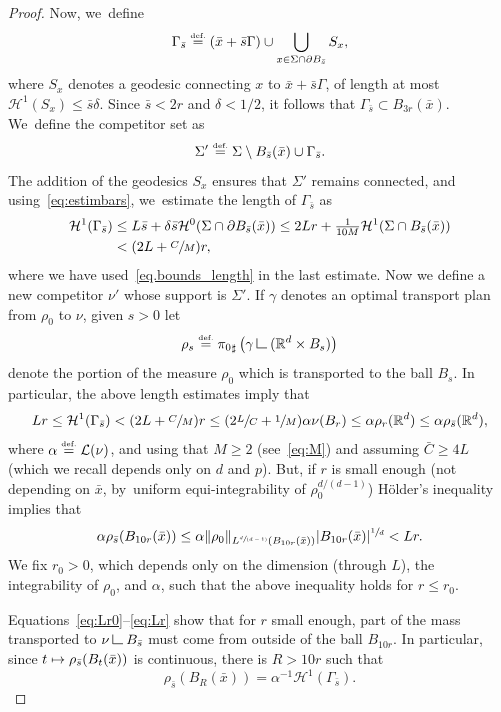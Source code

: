 \documentclass[JEP,XML,SOM,Unicode,NoFloatCountersInSection,published]{cedram}
\newcommand\mto{\mathchoice{\longmapsto}{\mapsto}{\mapsto}{\mapsto}}
\newcommand{\spfrac}[2]{\sfrac{#1}{(#2)}}
\theoremstyle{definition}
\newcommand{\eqdef}{\ensuremath{\stackrel{\mbox{\upshape\tiny def.}}{=}}}
\newcommand\LM[1]{\hbox{\vrule width.5pt \vbox to#1pt{\vfill \hrule width#1pt height.5pt}}}
\newcommand\LL{{\mathchoice {\>\LM7\>}{\>\LM7\>}{\,\LM5\,}{\,\LM{3.35}\,}}}
\newcommand{\mres}{\LL}
\newcommand\cH{\mathcal{H}}
\newcommand\cL{\mathcal{L}}
\newcommand{\RR}{\mathbb{R}}
\begin{document}
\begin{proof}
Now, we~define
\[
\Gamma_{\bar s} \eqdef (\bar x + \bar s \Gamma) \cup \bigcup_{x \in \Sigma \cap \partial B_{\bar s}} S_x,
\]
where $S_x$ denotes a geodesic connecting $x$ to $\bar x + \bar s \Gamma$, of
length at most $\cH^1(S_x)\le \bar s\delta$.
Since $\bar s<2r$ and $\delta<1/2$, it follows that $\Gamma_{\bar s} \subset B_{3r}(\bar x)$. We~define the competitor set as
\[
\Sigma' \eqdef \Sigma \setminus B_{\bar s}(\bar x) \cup \Gamma_{\bar s}.
\]
The addition of the geodesics $S_x$ ensures that $\Sigma'$ remains connected, and using~\eqref{eq:estimbars}, we~estimate the length of $\Gamma_{\bar s}$ as
\begin{equation}\label{eq:lengthGamma}
\begin{aligned}
\cH^1(\Gamma_{\bar s})
&\le L\bar s + \delta\bar s\cH^0(\Sigma\cap\partial B_{\bar s}(\bar x))
\le 2Lr + \tfrac{1}{10M}\cH^1(\Sigma\cap B_{\bar s}(\bar x))\\
&< (2L + \sfrac{C}{M})r,
\end{aligned}
\end{equation}
where we have used~\eqref{eq.bounds_length} in the last estimate.
Now we define a new competitor $\nu'$ whose support is $\Sigma'$. If $\gamma$ denotes an optimal transport plan from $\rho_0$ to $\nu$, given $s >0$ let
\[
\rho_{s} \eqdef {\pi_{0}}_\sharp\left(\gamma \mres(\RR^d\times B_{s})\right)
\]
denote the portion of the measure $\rho_0$ which is transported to the ball $B_{s}$. In particular, the above length estimates imply that
\begin{equation}\label{eq:Lr0}
Lr
\le
\cH^1(\Gamma_{\bar s})
<
(2L+\sfrac{C}{M})r
\le
(2\sfrac{L}{C}+\sfrac{1}{M})\alpha\nu(B_r)
\le
\alpha \rho_r(\RR^d)\leq \alpha \rho_{\bar s}(\RR^d),
\end{equation}
where $\alpha\eqdef\cL(\nu)$, and using that $M\ge 2$ (see~\eqref{eq:M}) and assuming $\bar C\ge 4L$ (which we recall depends
only on $d$ and $p$).
But, if $r$ is small enough (not depending on $\bar x$, by~uniform equi-integrability
of $\rho_0^{d/(d-1)}$) Hölder's inequality implies that
\begin{equation}\label{eq:Lr}
\alpha \rho_{\bar s}(B_{10r}(\bar x))
\le
\alpha\|\rho_0\|_{L^{\spfrac{d}{d-1}}(B_{10r}(\bar x))}
|B_{10r}(\bar x)|^{\sfrac{1}{d}} < Lr.
\end{equation}
We fix $r_0>0$, which depends only on the dimension (through $L$), the integrability of $\rho_0$, and $\alpha$, such that the above inequality holds for $r\le r_0$.

Equations~\eqref{eq:Lr0}--\eqref{eq:Lr} show that for $r$ small enough, part of the mass transported to $\nu \mres B_{\bar s}$ must come from outside of the ball $B_{10r}$. In particular, since $t \mto \rho_{\bar s}(B_t(\bar x))$ is continuous, there is $R > 10r$ such that
\begin{equation}\label{equation.mass_inNout_BR}
\rho_{\bar s}(B_R(\bar x)) = \alpha^{-1}\cH^1(\Gamma_{\bar s}).
\end{equation}


\end{proof}
\end{document}

